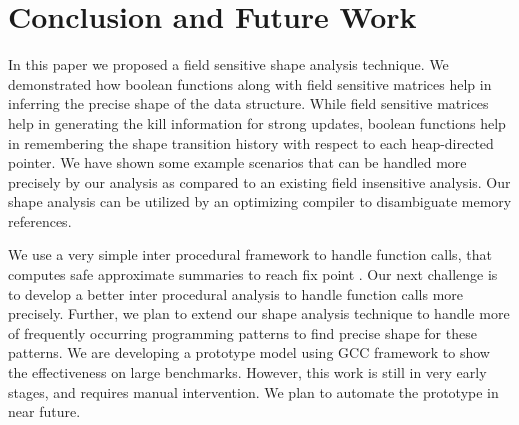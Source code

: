 \documentclass{sig-alternate}
\newcommand{\hide}[1]{} %
\begin{document}
\section{Conclusion and Future Work} \label{sec:concl}

In this paper we proposed a field sensitive shape analysis
technique. We demonstrated how boolean functions along with
field sensitive matrices help in inferring the precise shape
of the data structure.  While field sensitive matrices help
in generating the kill information for strong updates,
boolean functions help in remembering the shape transition
history with respect to each heap-directed pointer. We have
shown some example scenarios that can be handled more
precisely by our analysis as compared to an existing field
insensitive analysis. Our shape analysis can be utilized by
an optimizing compiler to disambiguate memory references.

We use a very simple inter procedural framework to handle
function calls, that computes safe approximate summaries to
reach fix point .  Our next challenge is to develop a better
inter procedural analysis to handle function calls more
precisely. Further, we plan to extend our shape analysis
technique to handle more of frequently occurring programming
patterns to find precise shape for these patterns. \hide{{ We
    also want to improve our summarization technique. Earlier
    we have used graph based approximations of access
    paths~\cite{khedker07heap} to compute liveness of heap
    data. We plan to explore if the same summarization
    technique can also be applied here instead of
    $k$-limiting.}} We are developing a prototype model using
GCC framework to show the effectiveness on large
benchmarks. However, this work is still in very early stages,
and requires manual intervention. We plan to automate the
prototype in near future.


  
\end{document}
